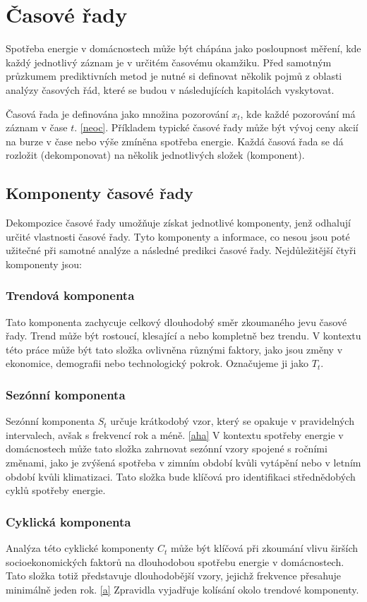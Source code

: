 \documentclass[FM,BP,fonts]{tulthesis}
\begin{document}
\chapter{Časové řady}
Spotřeba energie v domácnostech může být chápána jako posloupnost měření, kde každý jednotlivý záznam je v určitém časovému okamžiku. Před samotným průzkumem prediktivních metod je nutné si definovat několik pojmů z oblasti analýzy časových řád, které se budou v následujících kapitolách vyskytovat.

Časová řada je definována jako množina pozorování $x_t$, kde každé pozorování má záznam v čase $t$. \ref{neoc}. Příkladem typické časové řady může být vývoj ceny akcií na burze v čase nebo výše zmíněna spotřeba energie. Každá časová řada se dá rozložit (dekomponovat) na několik jednotlivých složek (komponent). 


\section{Komponenty časové řady}
Dekompozice časové řady umožňuje získat jednotlivé komponenty, jenž odhalují určité vlastnosti časové řady. Tyto komponenty a informace, co nesou jsou poté užitečné při samotné analýze a následné predikci časové řady. Nejdůležitější čtyři komponenty jsou:


\subsection{Trendová komponenta}
Tato komponenta zachycuje celkový dlouhodobý směr zkoumaného jevu časové řady. Trend může být rostoucí, klesající a nebo kompletně bez trendu. V kontextu této práce může být tato složka ovlivněna různými faktory, jako jsou změny v ekonomice, demografii nebo technologický pokrok. Označujeme ji jako $T_t$.

\subsection{Sezónní komponenta}
Sezónní komponenta $S_t$ určuje krátkodobý vzor, který se opakuje v pravidelných intervalech, avšak s frekvencí rok a méně. \ref{aha} V kontextu spotřeby energie v domácnostech může tato složka zahrnovat sezónní vzory spojené s ročními změnami, jako je zvýšená spotřeba v zimním období kvůli vytápění nebo v letním období kvůli klimatizaci. Tato složka bude klíčová pro identifikaci střednědobých cyklů spotřeby energie.

\subsection{Cyklická komponenta}
Analýza této cyklické komponenty $C_t$ může být klíčová při zkoumání vlivu širších socioekonomických faktorů na dlouhodobou spotřebu energie v domácnostech. Tato složka totiž představuje dlouhodobější vzory, jejichž frekvence přesahuje minimálně jeden rok. \ref{a} Zpravidla vyjadřuje kolísání okolo trendové komponenty.
\end{document}
